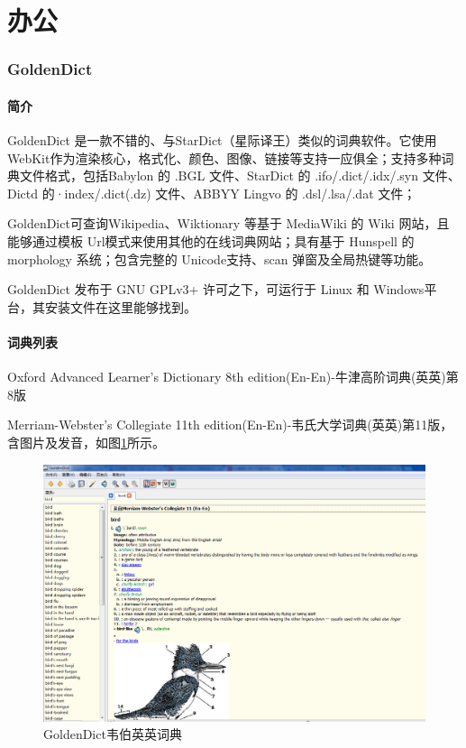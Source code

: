 \documentclass[paper=a4,fontsize=11pt]{article}
\begin{document}
	\clearpage
		
	\part{办公}
	
	\clearpage
	
	\section{GoldenDict}
	
	\subsection{简介}
	
	GoldenDict 是一款不错的、与StarDict（星际译王）类似的词典软件。它使用 WebKit作为渲染核心，格式化、颜色、图像、链接等支持一应俱全；支持多种词典文件格式，包括Babylon 的 .BGL 文件、StarDict 的 .ifo/.dict/.idx/.syn 文件、Dictd 的·index/.dict(.dz) 文件、ABBYY Lingvo 的 .dsl/.lsa/.dat 文件；
	
	GoldenDict可查询Wikipedia、Wiktionary 等基于 MediaWiki 的 Wiki 网站，且能够通过模板 Url模式来使用其他的在线词典网站；具有基于 Hunspell 的 morphology 系统；包含完整的 Unicode支持、scan 弹窗及全局热键等功能。
	
	GoldenDict 发布于 GNU GPLv3+ 许可之下，可运行于 Linux 和 Windows平台，其安装文件在这里能够找到。
	
	\subsection{词典列表}
	
	Oxford Advanced Learner's Dictionary 8th edition(En-En)-牛津高阶词典(英英)第8版
	
	Merriam-Webster's Collegiate 11th edition(En-En)-韦氏大学词典(英英)第11版，含图片及发音，如图\ref{GoldenDictWebster}所示。    
	
	\begin{figure}[htbp]
		\centering
		\includegraphics[scale=0.35]{GoldenDictWebster.jpg}
		\caption{GoldenDict韦伯英英词典}
		\label{GoldenDictWebster}
	\end{figure}
	
\end{document}
